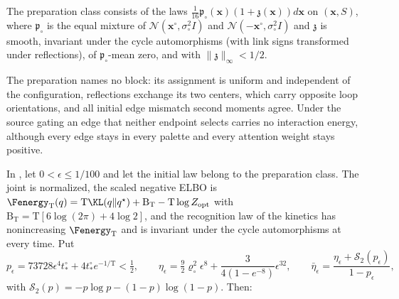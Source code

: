 The preparation class consists of the laws
\(\frac1{16}\mathfrak p_\circ(\mathbf x)(1+\mathfrak z(\mathbf x)) d\mathbf x\)
on \((\mathbf x,S)\), where \(\mathfrak p_\circ\) is the equal mixture of
\(\mathcal N(\mathbf x^\circ,\sigma_\circ^2I)\) and
\(\mathcal N(-\mathbf x^\circ,\sigma_\circ^2I)\) and \(\mathfrak z\) is smooth,
invariant under the cycle automorphisms (with link signs transformed under
reflections), of \(\mathfrak p_\circ\)-mean zero, and with
\(\|\mathfrak z\|_\infty<1/2\).

The preparation names no block: its assignment is uniform and independent of
the configuration, reflections exchange its two centers, which carry opposite
loop orientations, and all initial edge mismatch second moments agree. Under
the source gating an edge that neither endpoint selects carries no
interaction energy, although every edge stays in every palette and every
attention weight stays positive.

In , let \(0<\epsilon\le1/100\) and let
the initial law belong to the preparation class. The joint is normalized, the
scaled negative ELBO is
\(\Fenergy_{\mathrm T}(q)=\mathrm T\KL(q\Vert q^\star)+\mathrm B_{\mathrm T}
-\mathrm T\log Z_{\mathrm{opt}}\) with
\(\mathrm B_{\mathrm T}=\mathrm T[6\log(2\pi)+4\log2]\), and the recognition law
of the kinetics has nonincreasing \(\Fenergy_{\mathrm T}\) and is invariant
under the cycle automorphisms at every time. Put
\begin{equation}
p_\epsilon=73728 \epsilon^4t^\circ_*+4t^\circ_*e^{-1/\mathrm T}<\tfrac12,
\qquad
\eta_\epsilon=\tfrac92\varrho_\circ^2\epsilon^8+\frac{3}{4(1-e^{-8})}\epsilon^{32},
\qquad
\bar\eta_\epsilon=\frac{\eta_\epsilon+\mathcal S_2(p_\epsilon)}{1-p_\epsilon},
\label{eq:rg-formation-cycle-constants}
\end{equation}
with \(\mathcal S_2(p)=-p\log p-(1-p)\log(1-p)\). Then:

